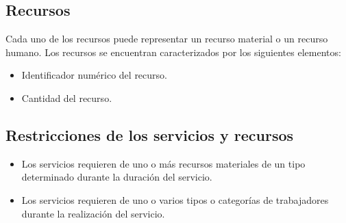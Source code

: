 



\subsection{Recursos}

Cada uno de los recursos puede representar un recurso material o un recurso humano. Los recursos se encuentran caracterizados por los siguientes elementos:
\begin{itemize}
    \item Identificador numérico del recurso.
    \item Cantidad del recurso. 
\end{itemize}

\subsection{Restricciones de los servicios y recursos}

\begin{itemize}
    \item Los servicios requieren de uno o más recursos materiales de un tipo determinado durante la duración del servicio.
    \item Los servicios requieren de uno o varios tipos o categorías de trabajadores durante la realización del servicio.
\end{itemize}

